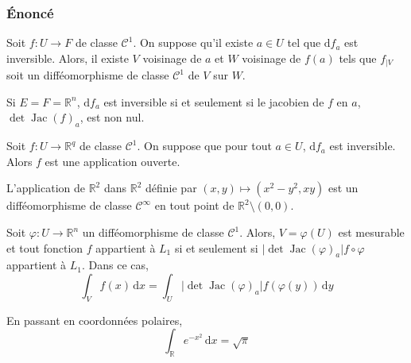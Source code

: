   \subsubsection{Énoncé}


  \begin{theorem}
    Soit $f : U \rightarrow F$ de classe $\mathcal{C}^1$. On suppose qu'il existe $a \in U$ tel que $\mathrm{d}f_a$ est inversible.
    \newpar
    Alors, il existe $V$ voisinage de $a$ et $W$ voisinage de $f(a)$ tels que $f_{|V}$ soit un difféomorphisme de classe $\mathcal{C}^1$ de $V$ sur $W$.
  \end{theorem}

  \begin{remark}
    Si $E = F = \mathbb{R}^n$, $\mathrm{d}f_a$ est inversible si et seulement si le jacobien de $f$ en $a$, $\det \operatorname{Jac}(f)_a$, est non nul.
  \end{remark}

  \begin{corollary}
    Soit $f : U \rightarrow \mathbb{R}^q$ de classe $\mathcal{C}^1$. On suppose que pour tout $a \in U$, $\mathrm{d}f_a$ est inversible. Alors $f$ est une application ouverte.
  \end{corollary}


  \begin{example}
    \label{214-1}
    L'application de $\mathbb{R}^2$ dans $\mathbb{R}^2$ définie par $(x, y) \mapsto (x^2-y^2, xy)$ est un difféomorphisme de classe $\mathcal{C}^\infty$ en tout point de $\mathbb{R}^2 \setminus (0,0)$.
  \end{example}


  \begin{application}
    Soit $\varphi : U \rightarrow \mathbb{R}^n$ un difféomorphisme de classe $\mathcal{C}^1$. Alors, $V = \varphi(U)$ est mesurable et tout fonction $f$ appartient à $L_1$ si et seulement si $\vert \det \operatorname{Jac}(\varphi)_a \vert f \circ \varphi$ appartient à $L_1$. Dans ce cas,
    \[ \int_V f(x) \, \mathrm{d}x = \int_U \vert \det \operatorname{Jac}(\varphi)_a \vert f (\varphi(y)) \, \mathrm{d}y \]
  \end{application}


  \begin{example}
    En passant en coordonnées polaires,
    \[ \int_{\mathbb{R}} e^{-x^2} \, \mathrm{d}x = \sqrt{\pi} \]
  \end{example}

